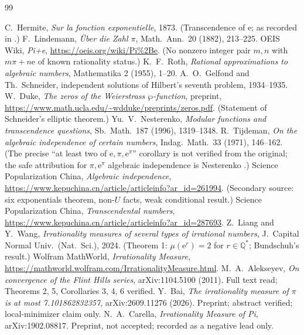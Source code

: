\documentclass[11pt]{amsart}
\theoremstyle{definition}
\theoremstyle{remark}
\numberwithin{equation}{section}
\newcommand{\Q}{\mathbb{Q}}
\newcommand{\irr}{\mu}
\newcommand{\ee}{\mathrm{e}}
\begin{document}
\begin{thebibliography}{99}

 C.~Hermite, \emph{Sur la fonction exponentielle}, 1873. (Transcendence of $\ee$; as recorded in \cite{KepuTrans}.)
 F.~Lindemann, \emph{\"Uber die Zahl $\pi$}, Math.~Ann.~20 (1882), 213--225.
 OEIS Wiki, \emph{Pi+e}, \url{https://oeis.org/wiki/Pi\%2Be}. (No nonzero integer pair $m,n$ with $m\pi+n\ee$ of known rationality status.)
 K.~F.~Roth, \emph{Rational approximations to algebraic numbers}, Mathematika 2 (1955), 1--20.
 A.~O.~Gelfond and Th.~Schneider, independent solutions of Hilbert's seventh problem, 1934--1935.
 W.~Duke, \emph{The zeros of the Weierstrass $\wp$-function}, preprint, \url{https://www.math.ucla.edu/~wdduke/preprints/zeros.pdf}. (Statement of Schneider's elliptic theorem.)
 Yu.~V.~Nesterenko, \emph{Modular functions and transcendence questions}, Sb.~Math.~187 (1996), 1319--1348.
 R.~Tijdeman, \emph{On the algebraic independence of certain numbers}, Indag.~Math.~33 (1971), 146--162. (The precise ``at least two of $\ee,\pi,\ee^\pi$'' corollary is not verified from the original; the safe attribution for $\pi,\ee^\pi$ algebraic independence is Nesterenko \cite{Nesterenko1996}.)
 Science Popularization China, \emph{Algebraic independence}, \url{https://www.kepuchina.cn/article/articleinfo?ar_id=261994}. (Secondary source: six exponentials theorem, non-$U$ facts, weak conditional result.)
 Science Popularization China, \emph{Transcendental numbers}, \url{https://www.kepuchina.cn/article/articleinfo?ar_id=287693}.
 Z.~Liang and Y.~Wang, \emph{Irrationality measures of several types of irrational numbers}, J.~Capital Normal Univ.~(Nat.~Sci.), 2024. (Theorem 1: $\irr(\ee^r)=2$ for $r\in\Q^*$; Bundschuh's result.)
 Wolfram MathWorld, \emph{Irrationality Measure}, \url{https://mathworld.wolfram.com/IrrationalityMeasure.html}.
 M.~A.~Alekseyev, \emph{On convergence of the Flint Hills series}, arXiv:1104.5100 (2011). Full text read; Theorems 2, 5, Corollaries 3, 4, 6 verified.
 Y.~Bai, \emph{The irrationality measure of $\pi$ is at most 7.101862832357}, arXiv:2609.11276 (2026). Preprint; abstract verified; local-minimizer claim only.
 N.~A.~Carella, \emph{Irrationality Measure of Pi}, arXiv:1902.08817. Preprint, not accepted; recorded as a negative lead only.

\end{thebibliography}
\end{document}
